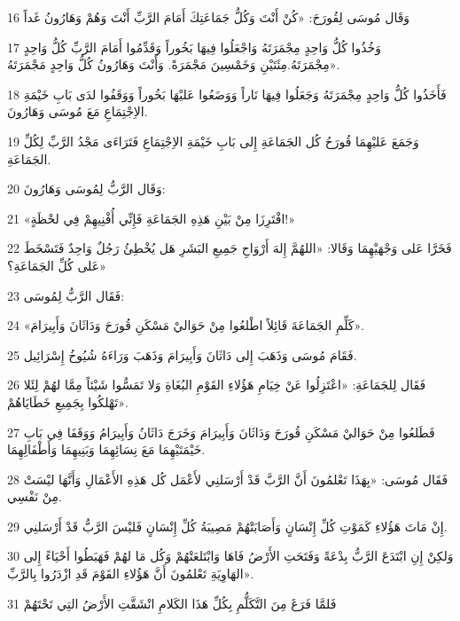 \par 16 وَقَال مُوسَى لِقُورَحَ: «كُنْ أَنْتَ وَكُلُّ جَمَاعَتِكَ أَمَامَ الرَّبِّ أَنْتَ وَهُمْ وَهَارُونُ غَداً
\par 17 وَخُذُوا كُلُّ وَاحِدٍ مِجْمَرَتَهُ وَاجْعَلُوا فِيهَا بَخُوراً وَقَدِّمُوا أَمَامَ الرَّبِّ كُلُّ وَاحِدٍ مِجْمَرَتَهُ.مِئَتَيْنِ وَخَمْسِينَ مَجْمَرَةً. وَأَنْتَ وَهَارُونُ كُلُّ وَاحِدٍ مَجْمَرَتَهُ».
\par 18 فَأَخَذُوا كُلُّ وَاحِدٍ مِجْمَرَتَهُ وَجَعَلُوا فِيهَا نَاراً وَوَضَعُوا عَليْهَا بَخُوراً وَوَقَفُوا لدَى بَابِ خَيْمَةِ الاِجْتِمَاعِ مَعَ مُوسَى وَهَارُونَ.
\par 19 وَجَمَعَ عَليْهِمَا قُورَحُ كُل الجَمَاعَةِ إِلى بَابِ خَيْمَةِ الاِجْتِمَاعِ فَتَرَاءَى مَجْدُ الرَّبِّ لِكُلِّ الجَمَاعَةِ.
\par 20 وَقَال الرَّبُّ لِمُوسَى وَهَارُونَ:
\par 21 «افْتَرِزَا مِنْ بَيْنِ هَذِهِ الجَمَاعَةِ فَإِنِّي أُفْنِيهِمْ فِي لحْظَةٍ!»
\par 22 فَخَرَّا عَلى وَجْهَيْهِمَا وَقَالا: «اللهُمَّ إِلهَ أَرْوَاحِ جَمِيعِ البَشَرِ هَل يُخْطِئُ رَجُلٌ وَاحِدٌ فَتَسْخَطَ عَلى كُلِّ الجَمَاعَةِ؟»
\par 23 فَقَال الرَّبُّ لِمُوسَى:
\par 24 «كَلِّمِ الجَمَاعَةَ قَائِلاً اطْلعُوا مِنْ حَوَاليْ مَسْكَنِ قُورَحَ وَدَاثَانَ وَأَبِيرَامَ».
\par 25 فَقَامَ مُوسَى وَذَهَبَ إِلى دَاثَانَ وَأَبِيرَامَ وَذَهَبَ وَرَاءَهُ شُيُوخُ إِسْرَائِيل.
\par 26 فَقَال لِلجَمَاعَةِ: «اعْتَزِلُوا عَنْ خِيَامِ هَؤُلاءِ القَوْمِ البُغَاةِ وَلا تَمَسُّوا شَيْئاً مِمَّا لهُمْ لِئَلا تَهْلكُوا بِجَمِيعِ خَطَايَاهُمْ».
\par 27 فَطَلعُوا مِنْ حَوَاليْ مَسْكَنِ قُورَحَ وَدَاثَانَ وَأَبِيرَامَ وَخَرَجَ دَاثَانُ وَأَبِيرَامُ وَوَقَفَا فِي بَابِ خَيْمَتَيْهِمَا مَعَ نِسَائِهِمَا وَبَنِيهِمَا وَأَطْفَالِهِمَا.
\par 28 فَقَال مُوسَى: «بِهَذَا تَعْلمُونَ أَنَّ الرَّبَّ قَدْ أَرْسَلنِي لأَعْمَل كُل هَذِهِ الأَعْمَالِ وَأَنَّهَا ليْسَتْ مِنْ نَفْسِي.
\par 29 إِنْ مَاتَ هَؤُلاءِ كَمَوْتِ كُلِّ إِنْسَانٍ وَأَصَابَتْهُمْ مَصِيبَةُ كُلِّ إِنْسَانٍ فَليْسَ الرَّبُّ قَدْ أَرْسَلنِي.
\par 30 وَلكِنْ إِنِ ابْتَدَعَ الرَّبُّ بِدْعَةً وَفَتَحَتِ الأَرْضُ فَاهَا وَابْتَلعَتْهُمْ وَكُل مَا لهُمْ فَهَبَطُوا أَحْيَاءً إِلى الهَاوِيَةِ تَعْلمُونَ أَنَّ هَؤُلاءِ القَوْمَ قَدِ ازْدَرُوا بِالرَّبِّ».
\par 31 فَلمَّا فَرَغَ مِنَ التَّكَلُّمِ بِكُلِّ هَذَا الكَلامِ انْشَقَّتِ الأَرْضُ التِي تَحْتَهُمْ
